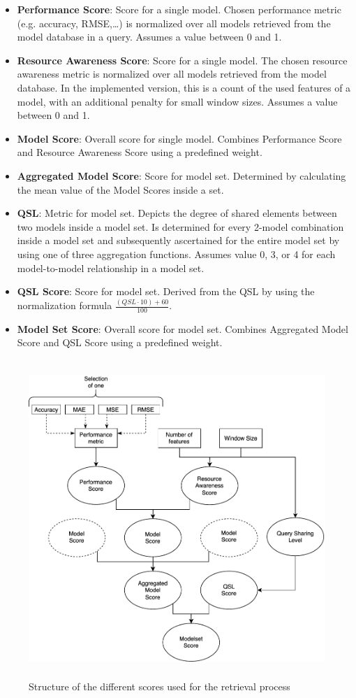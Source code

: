 \begin{itemize}
	\item \textbf{Performance Score}: Score for a single model. Chosen performance metric (e.g. accuracy, RMSE,…) is normalized over all models retrieved from the model database in a query. Assumes a value between 0 and 1.
\item \textbf{Resource Awareness Score}: Score for a single model. The chosen resource awareness metric is normalized over all models retrieved from the model database. In the implemented version, this is a count of the used features of a model, with an additional penalty for small window sizes. Assumes a value between 0 and 1.
\item \textbf{Model Score}: Overall score for single model. Combines Performance Score and Resource Awareness Score using a predefined weight. 
\item \textbf{Aggregated Model Score}: Score for model set. Determined by calculating the mean value of the Model Scores inside a set. 
\item \textbf{QSL}: Metric for model set. Depicts the degree of shared elements between two models inside a model set. Is determined for every 2-model combination inside a model set and subsequently ascertained for the entire model set by using one of three aggregation functions. Assumes value 0, 3, or 4 for each model-to-model relationship in a model set.
\item \textbf{QSL Score}: Score for model set. Derived from the QSL by using the normalization formula $\frac{(QSL \cdot 10) + 60}{100}$.
\item \textbf{Model Set Score}: Overall score for model set. Combines Aggregated Model Score and QSL Score using a predefined weight.
\end{itemize}


\begin{figure}[htbp]
  \centering
\includegraphics[height=12cm]{graphics/scores.pdf}
  \caption{Structure of the different scores used for the retrieval process}
  \label{scoreconstruction}
\end{figure}


